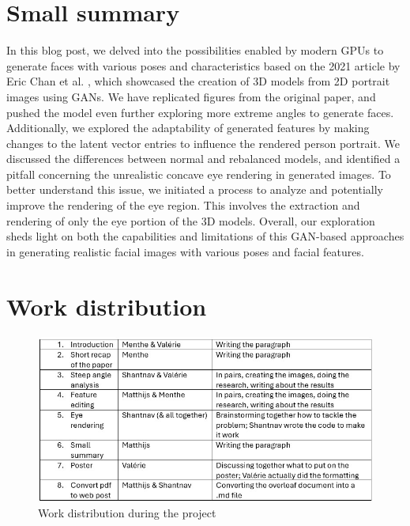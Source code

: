 \documentclass{article}
\begin{document}
\section{Small summary}
In this blog post, we delved into the possibilities enabled by modern GPUs to generate faces with various poses and characteristics based on the 2021 article by Eric Chan et al. \cite{chan2022efficient}, which showcased the creation of 3D models from 2D portrait images using GANs. We have replicated figures from the original paper, and pushed the model even further exploring more extreme angles to generate faces. Additionally, we explored the adaptability of generated features by making changes to the latent vector entries to influence the rendered person portrait. We discussed the differences between normal and rebalanced models, and identified a pitfall concerning the unrealistic concave eye rendering in generated images. To better understand this issue, we initiated a process to analyze and potentially improve the rendering of the eye region. This involves the extraction and rendering of only the eye portion of the 3D models. Overall, our exploration sheds light on both the capabilities and limitations of this GAN-based approaches in generating realistic facial images with various poses and facial features.


\section{Work distribution}

\begin{figure}[H]
    \centering
    \includegraphics[width=0.9\linewidth]{Work distribution.jpg}
    \caption[width=0.6]{Work distribution during the project}
    \label{fig:work_distribution}
\end{figure}

\printbibliography
\end{document}
